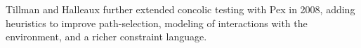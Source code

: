 %
%
Tillman and Halleaux further extended concolic testing with Pex
\cite{Tillmann2008-qc} in 2008, adding heuristics to improve
path-selection, modeling of interactions with the environment, and a
richer constraint language.
%


